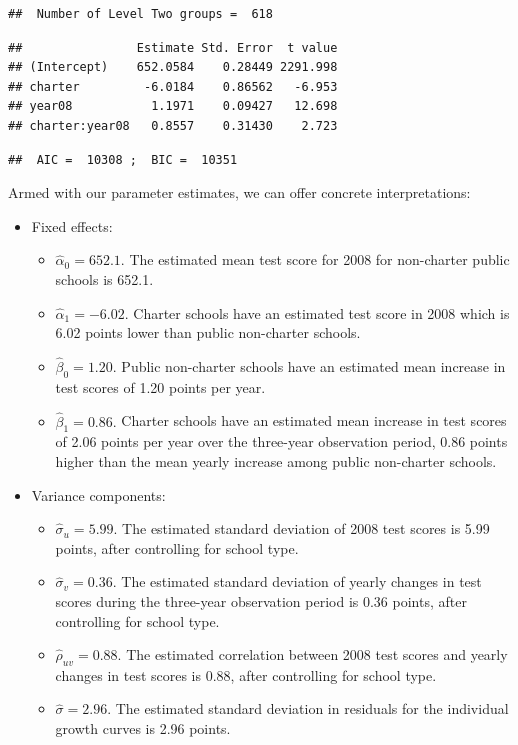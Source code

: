 \documentclass[
]{krantz}
\providecommand{\tightlist}{%
  \setlength{\itemsep}{0pt}\setlength{\parskip}{0pt}}
\begin{document}
\begin{verbatim}
##  Number of Level Two groups =  618
\end{verbatim}

\begin{verbatim}
##                Estimate Std. Error  t value
## (Intercept)    652.0584    0.28449 2291.998
## charter         -6.0184    0.86562   -6.953
## year08           1.1971    0.09427   12.698
## charter:year08   0.8557    0.31430    2.723
\end{verbatim}

\begin{verbatim}
##  AIC =  10308 ;  BIC =  10351
\end{verbatim}

Armed with our parameter estimates, we can offer concrete interpretations:

\begin{itemize}
\item
  Fixed effects:

  \begin{itemize}
  \tightlist
  \item
    \(\hat{\alpha}_{0} = 652.1.\) The estimated mean test score for 2008 for non-charter public schools is 652.1.
  \item
    \(\hat{\alpha}_{1}= -6.02.\) Charter schools have an estimated test score in 2008 which is 6.02 points lower than public non-charter schools.
  \item
    \(\hat{\beta}_{0}= 1.20.\) Public non-charter schools have an estimated mean increase in test scores of 1.20 points per year.
  \item
    \(\hat{\beta}_{1}= 0.86.\) Charter schools have an estimated mean increase in test scores of 2.06 points per year over the three-year observation period, 0.86 points higher than the mean yearly increase among public non-charter schools.
  \end{itemize}
\item
  Variance components:

  \begin{itemize}
  \tightlist
  \item
    \(\hat{\sigma}_u= 5.99.\) The estimated standard deviation of 2008 test scores is 5.99 points, after controlling for school type.
  \item
    \(\hat{\sigma}_v= 0.36.\) The estimated standard deviation of yearly changes in test scores during the three-year observation period is 0.36 points, after controlling for school type.
  \item
    \(\hat{\rho}_{uv}= 0.88.\) The estimated correlation between 2008 test scores and yearly changes in test scores is 0.88, after controlling for school type.
  \item
    \(\hat{\sigma}= 2.96.\) The estimated standard deviation in residuals for the individual growth curves is 2.96 points.
  \end{itemize}
\end{itemize}
\end{document}
